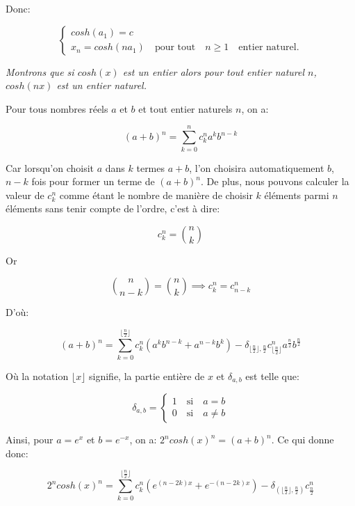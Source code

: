 \documentclass[12pt,a4paper,article]{memoir}
\newcommand{\floor}[1]{\lfloor #1 \rfloor}
\begin{document}
Donc:

\begin{equation}
\left\{
	\begin{array}{l}
cosh(a_{1}) = c\\
x_{n} = cosh(na_{1}) \quad \textrm{pour tout} \quad n \geq 1 \quad \textrm{entier naturel}.
\end{array}
\right.
\label{equation-pb-3-reccur-xn}
\end{equation}

\bigskip

\textit{Montrons que si $cosh(x)$ est un entier alors pour tout entier naturel $n$, $cosh(nx)$ est un entier naturel.}

\bigskip

Pour tous nombres réels $a$ et $b$ et tout entier naturels $n$, on a:

\[(a + b)^n = \sum_{k=0}^{n} c_{k}^{n} a^{k}b^{n-k}\]

Car lorsqu'on choisit $a$ dans $k$ termes $a + b$, l'on choisira automatiquement $b$, $n-k$ fois pour former un terme de $(a+b)^n$. De plus, nous pouvons calculer la valeur de $c_{k}^{n}$ comme étant le nombre de manière de choisir $k$ éléments parmi $n$ éléments sans tenir compte de l'ordre, c'est à dire:

\[c_{k}^{n} = \binom{n}{k} \]

Or 

\[\binom{n}{n-k} = \binom{n}{k} \implies c_{k}^{n} = c_{n-k}^{n}\]

D'où:

\begin{equation}
(a + b)^n  = \sum_{k=0}^{\floor{\frac{n}{2}}} c_{k}^{n} (a^{k}b^{n-k} + a^{n-k}b^{k}) - \delta_{\floor{\frac{n}{2}}, \frac{n}{2}} c_{\floor{\frac{n}{2}}}^{n} a^{\frac{n}{2}}b^{\frac{n}{2}}
\label{equation-pb-3-sumabpown-2}
\end{equation}
 
 Où la notation $\floor{x}$ signifie, la partie entière de $x$ et $\delta_{a,b}$ est telle que:
 
 \[\delta_{a, b} = \left\{
	\begin{array}{l}
	1 \quad \textrm{si} \quad a = b\\
	0 \quad \textrm{si} \quad a \neq b
	\end{array}
\right.\]

Ainsi, pour $a = e^{x}$ et $b = e^{-x}$, on a: $2^{n}cosh(x)^{n} = (a + b)^{n}$. Ce qui donne donc:

\[
2^{n}cosh(x)^{n} = \sum_{k=0}^{\floor{\frac{n}{2}}} c_{k}^{n} (e^{(n-2k)x} + e^{-(n-2k)x}) - \delta_{(\floor{\frac{n}{2}}, \frac{n}{2})} c_{\frac{n}{2}}^{n}
\]
\end{document}
